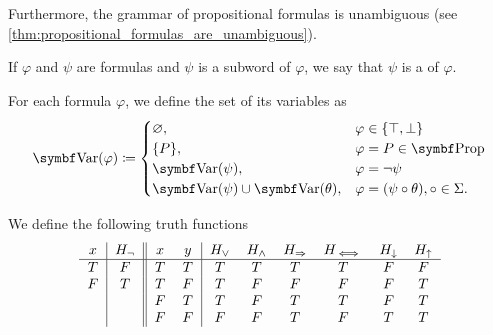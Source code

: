 \begin{definition}
  Furthermore, the grammar of propositional formulas is unambiguous (see \cref{thm:propositional_formulas_are_unambiguous}).

  If \( \varphi \) and \( \psi \) are formulas and \( \psi \) is a subword of \( \varphi \), we say that \( \psi \) is a  of \( \varphi \).

  For each formula \( \varphi \), we define the set of its variables as
  \begin{align*}
    \Cat{Var}(\varphi) \coloneqq \begin{cases}
      \varnothing,                              &\varphi \in \{ \top, \bot \} \\
      \{ P \},                                  &\varphi = P \in \Cat{Prop} \\
      \Cat{Var}(\psi),                         &\varphi = \neg \psi \\
      \Cat{Var}(\psi) \cup \Bold{Var}(\theta), &\varphi = (\psi \circ \theta), \circ \in \Sigma.
    \end{cases}
  \end{align*}
\end{definition}

\begin{definition}\label{def:truth_functions}
  We define the following truth functions
  \begin{equation*}
    \begin{tabular}{c | c || c c | c c c c c c}
      \( x \)    & \( H_\neg \) & \( x \)    & \( y \)    & \( H_\lor \) & \( H_\land \) & \( H_\Rightarrow \) & \( H_{\iff} \) & \( H_\downarrow \) & \( H_\uparrow \) \\
      \hline
      \( T \)    & \( F \)      & \( T \)    & \( T \)    & \( T \)      & \( T \)       & \( T \)          & \( T \)      & \( F \)            & \( F \)    \\
      \( F \)    & \( T \)      & \( T \)    & \( F \)    & \( T \)      & \( F \)       & \( F \)          & \( F \)      & \( F \)            & \( T \)    \\
             &          & \( F \)    & \( T \)    & \( T \)      & \( F \)       & \( T \)          & \( T \)      & \( F \)            & \( T \)    \\
             &          & \( F \)    & \( F \)    & \( F \)      & \( F \)       & \( T \)          & \( F \)      & \( T \)            & \( T \)
    \end{tabular}
  \end{equation*}
\end{definition}

